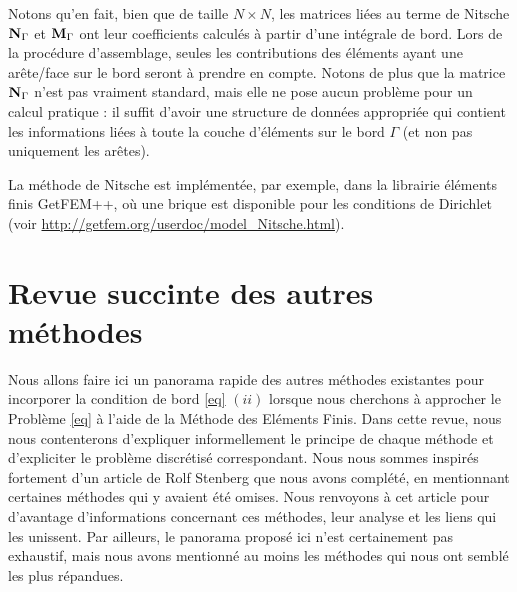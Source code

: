 \documentclass[11pt]{book}
\newtheorem{remark}[theorem]{Remarque}
\newcommand{\br}{\begin{remark}}
\newcommand{\er}{\end{remark}}
\def\NN{{\bf N}}
\def\M{{\bf M}}
\def\G{{\Gamma}}
\begin{document}
Notons qu'en fait, bien que de taille $N\times N$, les matrices liées au terme de Nitsche $\NN_\G$ et $\M_\G$ ont leur coefficients calculés à partir d'une intégrale de bord. Lors de la procédure d'assemblage, seules les contributions des éléments ayant une arête/face sur le bord seront à prendre en compte. Notons de plus que la matrice $\NN_\G$ n'est pas vraiment standard, mais elle ne pose aucun problème pour un calcul pratique : il suffit d'avoir une structure de données appropriée qui contient les informations liées à toute la couche d'éléments sur le bord $\G$ (et non pas uniquement les arêtes).

La méthode de Nitsche est implémentée, par exemple,
dans la librairie éléments finis GetFEM++, où une brique est disponible pour les conditions de Dirichlet (voir \url{http://getfem.org/userdoc/model_Nitsche.html}).


\section{Revue succinte des autres méthodes}
\label{sect:revue}

Nous allons faire ici un panorama rapide des autres méthodes existantes pour incorporer la condition de bord \eqref{eq} $(ii)$ lorsque nous cherchons à approcher le Problème \eqref{eq} à l'aide de la Méthode des Eléments Finis. %
Dans cette revue, nous nous contenterons d'expliquer informellement le principe de chaque méthode et d'expliciter le problème discrétisé correspondant. Nous nous sommes inspirés fortement d'un article de Rolf Stenberg \cite{stenberg-95} que nous avons complété, en mentionnant certaines méthodes qui y avaient été omises. Nous renvoyons à cet article pour d'avantage d'informations concernant ces méthodes, leur analyse et les liens qui les unissent. 
Par ailleurs, le panorama proposé ici n'est certainement pas exhaustif, mais nous avons mentionné au moins les méthodes qui nous ont semblé les plus répandues.
\end{document}
